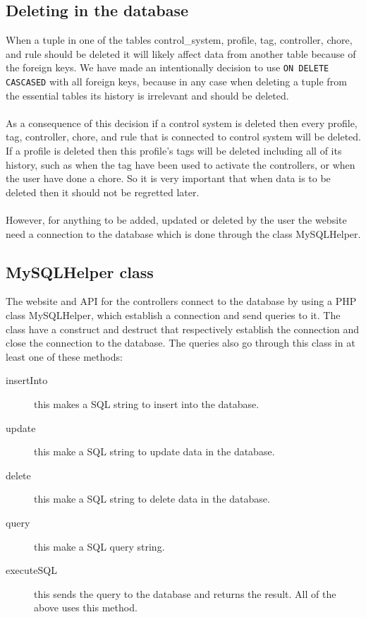 \subsection{Deleting in the database}
When a tuple in one of the tables control\_system, profile, tag, controller, chore, and rule should be deleted it will likely affect data from another table because of the foreign keys. We have made an intentionally decision to use \texttt{ON DELETE CASCASED} with all foreign keys, because in any case when deleting a tuple from the essential tables its history is irrelevant and should be deleted.\\
\\
As a consequence of this decision if a control system is deleted then every profile, tag, controller, chore, and rule that is connected to control system will be deleted. If a profile is deleted then this profile's tags will be deleted including all of its history, such as when the tag have been used to activate the controllers, or when the user have done a chore.
 So it is very important that when data is to be deleted then it should not be regretted later.  \\\\

However, for anything to be added, updated or deleted by the user the website need a connection to the database which is done through the class MySQLHelper. 

\subsection{MySQLHelper class}
The website and API for the controllers connect to the database by using a PHP class MySQLHelper, which establish a connection and send queries to it. The class have a construct and destruct that respectively establish the connection and close the connection to the database. The queries also go through this class in at least one of these methods:

\begin{description}
	\item[insertInto] this makes a SQL string to insert into the database.
	\item[update] this make a SQL string to update data in the database.	
	\item[delete] this make a SQL string to delete data in the database.
	\item[query] this make a SQL query string.
	\item[executeSQL] this sends the query to the database and returns the result. All of the above uses this method.
\end{description}
  
